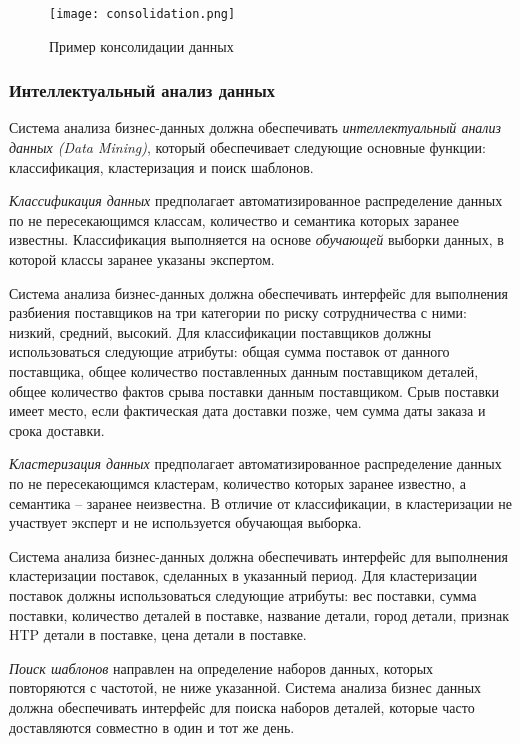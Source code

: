 \begin{figure}[h]
  \centering
  \texttt{[image: consolidation.png]}
  \caption{Пример консолидации данных}
  \label{consolidation}
\end{figure}

\subsubsection{Интеллектуальный анализ данных}
Система анализа бизнес-данных должна обеспечивать \textit{интеллектуальный анализ данных (Data Mining)}, который обеспечивает следующие основные функции: классификация, кластеризация и поиск шаблонов.\par
\textit{Классификация данных} предполагает автоматизированное распределение данных по не пересекающимся классам, количество и семантика которых заранее известны. Классификация выполняется на основе \textit{обучающей} выборки данных, в которой классы заранее указаны экспертом.\par
Система анализа бизнес-данных должна обеспечивать интерфейс для выполнения разбиения поставщиков на три категории по риску сотрудничества с ними: низкий, средний, высокий. Для классификации поставщиков должны использоваться следующие атрибуты: общая сумма поставок от данного поставщика, общее количество поставленных данным поставщиком деталей, общее количество фактов срыва поставки данным поставщиком. Срыв поставки имеет место, если фактическая дата доставки позже, чем сумма даты заказа и срока доставки.\par
\textit{Кластеризация данных} предполагает автоматизированное распределение данных по не пересекающимся кластерам, количество которых заранее известно, а семантика – заранее неизвестна. В отличие от классификации, в кластеризации не участвует эксперт и не используется обучающая выборка.\par
Система анализа бизнес-данных должна обеспечивать интерфейс для выполнения кластеризации поставок, сделанных в указанный период. Для кластеризации поставок должны использоваться следующие атрибуты: вес поставки, сумма поставки, количество деталей в поставке, название детали, город детали, признак HTP детали в поставке, цена детали в поставке. \par
\textit{Поиск шаблонов} направлен на определение наборов данных, которых повторяются с частотой, не ниже указанной. Система анализа бизнес данных должна обеспечивать интерфейс для поиска наборов деталей, которые часто доставляются совместно в один и тот же день.


